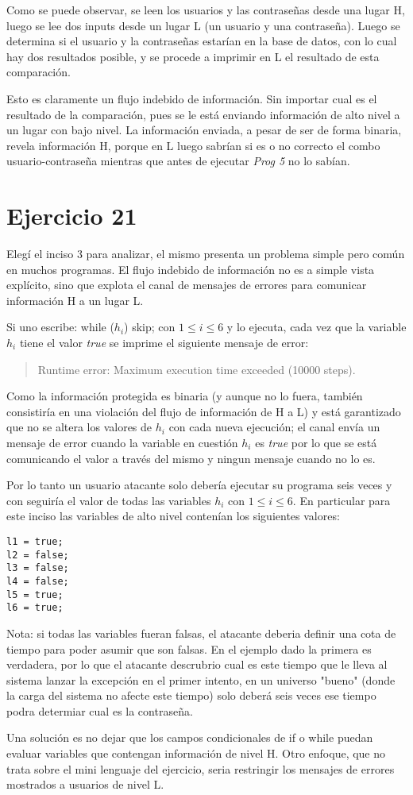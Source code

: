 \documentclass[12pt]{article}%
\begin{document}
Como se puede observar, se leen los usuarios y las contraseñas desde
una lugar H, luego se lee dos inputs desde un lugar L (un usuario y
una contraseña).  Luego se determina si el usuario y la contraseñas
estarían en la base de datos, con lo cual hay dos resultados posible,
y se procede a imprimir en L el resultado de esta comparación.

Esto es claramente un flujo indebido de información. Sin importar cual
es el resultado de la comparación, pues se le está enviando
información de alto nivel a un lugar con bajo nivel. La información
enviada, a pesar de ser de forma binaria, revela información H, porque
en L luego sabrían si es o no correcto el combo usuario-contraseña
mientras que antes de ejecutar \textit{Prog 5} no lo sabían.

\section*{Ejercicio 21}
Elegí el inciso 3 para analizar, el mismo presenta un problema simple
pero común en muchos programas. El flujo indebido de información no es
a simple vista explícito, sino que explota el canal de mensajes de
errores para comunicar información H a un lugar L.

Si uno escribe: while ($h_{i}$) skip; con $1 \leq i \leq 6$ y lo
ejecuta, cada vez que la variable $h_{i}$ tiene el valor
\textit{true} se imprime el siguiente mensaje de error:
\begin{quote}
Runtime error: Maximum execution time exceeded (10000 steps).  
\end{quote}

Como la información protegida es binaria (y aunque no lo fuera,
también consistiría en una violación del flujo de información de H a
L) y está garantizado que no se altera los valores de $h_{i}$ con cada
nueva ejecución; el canal envía un mensaje de error cuando la variable
en cuestión $h_{i}$ es \textit{true} por lo que se está comunicando el
valor a través del mismo y ningun mensaje cuando no lo es.


Por lo tanto un usuario atacante solo debería ejecutar su programa
seis veces y con seguiría el valor de todas las variables $h_{i}$ con
$1 \leq i \leq 6$. En particular para este inciso las variables de
alto nivel contenían los siguientes valores:
\begin{verbatim}
l1 = true;
l2 = false;
l3 = false;
l4 = false;
l5 = true;
l6 = true;
\end{verbatim}

Nota: si todas las variables fueran falsas, el atacante deberia
definir una cota de tiempo para poder asumir que son falsas. En el
ejemplo dado la primera es verdadera, por lo que el atacante
descrubrio cual es este tiempo que le lleva al sistema lanzar la
excepción en el primer intento, en un universo "bueno" (donde la
carga del sistema no afecte este tiempo) solo deberá seis veces ese
tiempo podra determiar cual es la contraseña.

Una solución es no dejar que los campos condicionales de if o while
puedan evaluar variables que contengan información de nivel H.  Otro
enfoque, que no trata sobre el mini lenguaje del ejercicio, seria
restringir los mensajes de errores mostrados a usuarios de nivel L.
\end{document}
